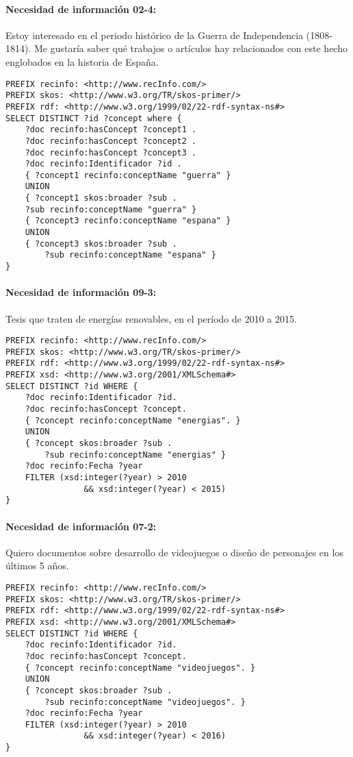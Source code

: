 \documentclass[a4paper]{article}
\begin{document}
\paragraph{Necesidad de información 02-4:}Estoy interesado en el periodo histórico de la Guerra de Independencia (1808-1814). Me gustaría saber qué trabajos o artículos hay relacionados con este hecho englobados en la historia de España.
\begin{lstlisting}[captionpos=b, caption=Consulta SPARQL para la necesidad de información 02-4, label=lst:sparql,
basicstyle=\ttfamily,frame=single]
PREFIX recinfo: <http://www.recInfo.com/>
PREFIX skos: <http://www.w3.org/TR/skos-primer/>
PREFIX rdf: <http://www.w3.org/1999/02/22-rdf-syntax-ns#>
SELECT DISTINCT ?id ?concept where {
	?doc recinfo:hasConcept ?concept1 .
	?doc recinfo:hasConcept ?concept2 .
	?doc recinfo:hasConcept ?concept3 .
	?doc recinfo:Identificador ?id .
	{ ?concept1 recinfo:conceptName "guerra" }
	UNION
	{ ?concept1 skos:broader ?sub .
	?sub recinfo:conceptName "guerra" }
	{ ?concept3 recinfo:conceptName "espana" }
	UNION
	{ ?concept3 skos:broader ?sub .
		?sub recinfo:conceptName "espana" }
}
\end{lstlisting}
\paragraph{Necesidad de información 09-3:}Tesis que traten de energías renovables, en el período de 2010 a 2015.
\begin{lstlisting}[captionpos=b, caption=Consulta SPARQL para la necesidad de información 09-3, label=lst:sparql,
basicstyle=\ttfamily,frame=single]
PREFIX recinfo: <http://www.recInfo.com/>
PREFIX skos: <http://www.w3.org/TR/skos-primer/>
PREFIX rdf: <http://www.w3.org/1999/02/22-rdf-syntax-ns#>
PREFIX xsd: <http://www.w3.org/2001/XMLSchema#>
SELECT DISTINCT ?id WHERE {
	?doc recinfo:Identificador ?id.
	?doc recinfo:hasConcept ?concept.
	{ ?concept recinfo:conceptName "energias". } 
	UNION
	{ ?concept skos:broader ?sub .
		?sub recinfo:conceptName "energias" }
	?doc recinfo:Fecha ?year
	FILTER (xsd:integer(?year) > 2010 
				&& xsd:integer(?year) < 2015)
}
\end{lstlisting}
\newpage
\paragraph{Necesidad de información 07-2:}Quiero documentos sobre desarrollo de videojuegos o diseño de personajes en los últimos 5 años.
\begin{lstlisting}[captionpos=b, caption=Consulta SPARQL para la necesidad de información 07-2, label=lst:sparql,
basicstyle=\ttfamily,frame=single]
PREFIX recinfo: <http://www.recInfo.com/>
PREFIX skos: <http://www.w3.org/TR/skos-primer/>
PREFIX rdf: <http://www.w3.org/1999/02/22-rdf-syntax-ns#>
PREFIX xsd: <http://www.w3.org/2001/XMLSchema#>
SELECT DISTINCT ?id WHERE {
	?doc recinfo:Identificador ?id.
	?doc recinfo:hasConcept ?concept.
	{ ?concept recinfo:conceptName "videojuegos". }
	UNION
	{ ?concept skos:broader ?sub .
		?sub recinfo:conceptName "videojuegos". }
	?doc recinfo:Fecha ?year
	FILTER (xsd:integer(?year) > 2010 
				&& xsd:integer(?year) < 2016)
}
\end{lstlisting}
\end{document}

